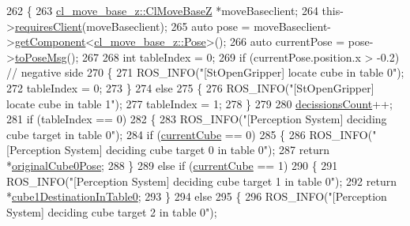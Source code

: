 \begin{DoxyCode}
262   \{
263     \hyperlink{classcl__move__base__z_1_1ClMoveBaseZ}{cl\_move\_base\_z::ClMoveBaseZ} *moveBaseclient;
264     this->\hyperlink{classsmacc_1_1ISmaccClient_a7a9990a2f3e35d547671188d69fee520}{requiresClient}(moveBaseclient);
265     \textcolor{keyword}{auto} pose = moveBaseclient->\hyperlink{classsmacc_1_1ISmaccClient_adef78db601749ca63c19e74a27cb88cc}{getComponent}<\hyperlink{classcl__move__base__z_1_1Pose}{cl\_move\_base\_z::Pose}>();
266     \textcolor{keyword}{auto} currentPose = pose->\hyperlink{classcl__move__base__z_1_1Pose_a9faf8c6b437ff6b19c8bddd692908dca}{toPoseMsg}();
267 
268     \textcolor{keywordtype}{int} tableIndex = 0;
269     \textcolor{keywordflow}{if} (currentPose.position.x > -0.2)  \textcolor{comment}{// negative side}
270     \{
271       ROS\_INFO(\textcolor{stringliteral}{"[StOpenGripper] locate cube in table 0"});
272       tableIndex = 0;
273     \}
274     \textcolor{keywordflow}{else}
275     \{
276       ROS\_INFO(\textcolor{stringliteral}{"[StOpenGripper] locate cube in table 1"});
277       tableIndex = 1;
278     \}
279 
280     \hyperlink{classsm__moveit__3_1_1cl__perception__system_1_1ClPerceptionSystem_a05c619f211e49dcfbcd3321c968ce1fc}{decissionsCount}++;
281     \textcolor{keywordflow}{if} (tableIndex == 0)
282     \{
283       ROS\_INFO(\textcolor{stringliteral}{"[Perception System] deciding cube target in table 0"});
284       \textcolor{keywordflow}{if} (\hyperlink{classsm__moveit__3_1_1cl__perception__system_1_1ClPerceptionSystem_ad915fc687481d4157ec40de52f8eaa82}{currentCube} == 0)
285       \{
286         ROS\_INFO(\textcolor{stringliteral}{"[Perception System] deciding cube target 0 in table 0"});
287         \textcolor{keywordflow}{return} *\hyperlink{classsm__moveit__3_1_1cl__perception__system_1_1ClPerceptionSystem_a296e8dd41bbb35a95d64e1780ab8be3d}{originalCube0Pose};
288       \}
289       \textcolor{keywordflow}{else} \textcolor{keywordflow}{if} (\hyperlink{classsm__moveit__3_1_1cl__perception__system_1_1ClPerceptionSystem_ad915fc687481d4157ec40de52f8eaa82}{currentCube} == 1)
290       \{
291         ROS\_INFO(\textcolor{stringliteral}{"[Perception System] deciding cube target 1 in table 0"});
292         \textcolor{keywordflow}{return} *\hyperlink{classsm__moveit__3_1_1cl__perception__system_1_1ClPerceptionSystem_aed05fa8526220f01330d5c2c2c014f71}{cube1DestinationInTable0};
293       \}
294       \textcolor{keywordflow}{else}
295       \{
296         ROS\_INFO(\textcolor{stringliteral}{"[Perception System] deciding cube target 2 in table 0"});

\end{DoxyCode}
